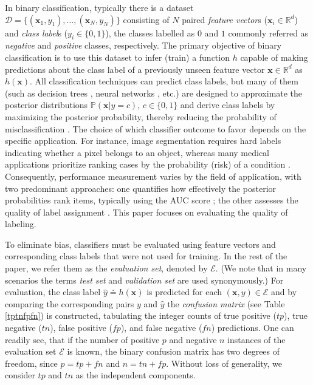 \documentclass[5p, final]{elsarticle}
\begin{document}
In binary classification, typically there is a dataset $\mathcal{D} = \lbrace(\mathbf{x}_1, y_1), \dots, (\mathbf{x}_N, y_N)\rbrace$ consisting of $N$ paired \emph{feature vector}s ($\mathbf{x}_i\in\mathbb{R}^{d}$) and \emph{class label}s ($y_i\in\lbrace 0, 1\rbrace$), the classes labelled as $0$ and $1$ commonly referred as \emph{negative} and \emph{positive} classes, respectively.
The primary objective of binary classification is to use this dataset to infer (train) a function $h$ capable of making predictions about the class label of a previously unseen feature vector $\mathbf{x}\in\mathbb{R}^d$ as $h(\mathbf{x})$. All classification techniques can predict class labels, but many of them (such as decision trees \cite{mlbook}, neural networks \cite{mlbook}, etc.) are designed to approximate the posterior distributions $\mathbb{P}(\mathbf{x}|y=c)$, $c\in\lbrace 0, 1\rbrace$ and derive class labels by maximizing the posterior probability, thereby reducing the probability of misclassification \cite{bayesclassifier}. The choice of which classifier outcome to favor depends on the specific application. For instance, image segmentation \cite{segmentation} requires hard labels indicating whether a pixel belongs to an object, whereas many medical applications prioritize ranking cases by the probability (risk) of a condition \cite{binclasranking}. Consequently, performance measurement varies by the field of application, with two predominant approaches: one quantifies how effectively the posterior probabilities rank items, typically using the AUC score \cite{aucsurvey, auc}; the other assesses the quality of label assignment \cite{scores}. This paper focuses on evaluating the quality of labeling.

To eliminate bias, classifiers must be evaluated using feature vectors and corresponding class labels that were not used for training. In the rest of the paper, we refer them as the \emph{evaluation set}, denoted by $\mathcal{E}$. (We note that in many scenarios the terms \emph{test set} and \emph{validation set} are used synonymously.) For evaluation, the class label $\hat{y} \doteq h(\mathbf{x})$ is predicted for each $(\mathbf{x}, y)\in\mathcal{E}$ and by comparing the corresponding pairs $y$ and $\hat{y}$ the \emph{confusion matrix} (see Table \ref{tptnfpfn}) is constructed, tabulating the integer counts of true positive ($tp$), true negative ($tn$), false positive ($fp$), and false negative ($fn$) predictions. 
One can readily see, that if the number of positive $p$ and negative $n$ instances of the evaluation set $\mathcal{E}$ is known, the binary confusion matrix has two degrees of freedom, since $p = tp + fn$ and $n = tn + fp$. Without loss of generality, we consider $tp$ and $tn$ as the independent components.
\end{document}
